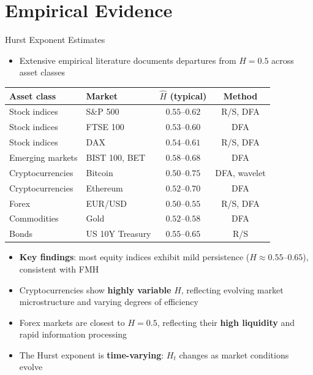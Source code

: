 \documentclass[9pt, aspectratio=169, t]{beamer}
\theoremstyle{definition}
\begin{document}
\section{Empirical Evidence}

\begin{frame}{Hurst Exponent Estimates}
    \begin{itemize}
        \item Extensive empirical literature documents departures from $H = 0.5$ across asset classes
    \end{itemize}
    \vspace{0.2cm}
    \begin{center}
        \renewcommand{\arraystretch}{1.2}
        \begin{tabular}{llcc}
            \toprule
            \textbf{Asset class} & \textbf{Market} & \textbf{$\hat{H}$ (typical)} & \textbf{Method} \\
            \midrule
            Stock indices & S\&P 500 & $0.55$--$0.62$ & R/S, DFA \\
            Stock indices & FTSE 100 & $0.53$--$0.60$ & DFA \\
            Stock indices & DAX & $0.54$--$0.61$ & R/S, DFA \\
            Emerging markets & BIST 100, BET & $0.58$--$0.68$ & DFA \\
            Cryptocurrencies & Bitcoin & $0.50$--$0.75$ & DFA, wavelet \\
            Cryptocurrencies & Ethereum & $0.52$--$0.70$ & DFA \\
            Forex & EUR/USD & $0.50$--$0.55$ & R/S, DFA \\
            Commodities & Gold & $0.52$--$0.58$ & DFA \\
            Bonds & US 10Y Treasury & $0.55$--$0.65$ & R/S \\
            \bottomrule
        \end{tabular}
    \end{center}
    \vspace{0.2cm}
    \begin{itemize}
        \item \textbf{Key findings}: most equity indices exhibit mild persistence ($H \approx 0.55\text{--}0.65$), consistent with FMH
        \item Cryptocurrencies show \textbf{highly variable} $H$, reflecting evolving market microstructure and varying degrees of efficiency
        \item Forex markets are closest to $H = 0.5$, reflecting their \textbf{high liquidity} and rapid information processing
        \item The Hurst exponent is \textbf{time-varying}: $H_t$ changes as market conditions evolve
    \end{itemize}
\end{frame}
\end{document}
